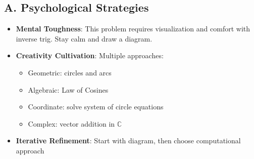 \documentclass[12pt]{article}
\begin{document}
\begin{strategicbox}
\subsection*{A. Psychological Strategies}
\begin{itemize}[leftmargin=*]
    \item \textbf{Mental Toughness}: This problem requires visualization and comfort with inverse trig. Stay calm and draw a diagram.
    \item \textbf{Creativity Cultivation}: Multiple approaches:
    \begin{itemize}
        \item Geometric: circles and arcs
        \item Algebraic: Law of Cosines
        \item Coordinate: solve system of circle equations
        \item Complex: vector addition in $\mathbb{C}$
    \end{itemize}
    \item \textbf{Iterative Refinement}: Start with diagram, then choose computational approach
\end{itemize}


\end{strategicbox}
\end{document}
